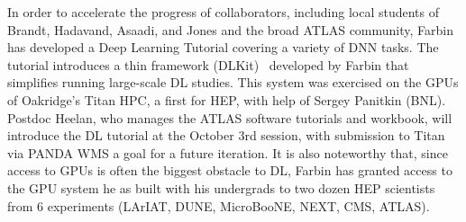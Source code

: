 In order to accelerate the progress of collaborators, including local
students of Brandt, Hadavand, Asaadi, and Jones and the broad ATLAS
community, Farbin has developed a Deep Learning Tutorial covering a
variety of DNN tasks. The tutorial introduces a thin framework
(DLKit)~\cite{DLKit} developed by Farbin that simplifies running
large-scale DL studies. This system was exercised on the GPUs of
Oakridge's Titan HPC, a first for HEP, with help of Sergey Panitkin
(BNL). Postdoc Heelan, who manages the ATLAS software tutorials and
workbook, will introduce the DL tutorial at the October 3rd session,
with submission to Titan via PANDA WMS a goal for a future iteration.
It is also noteworthy that, since access to GPUs is often the biggest
obstacle to DL, Farbin has granted access to the GPU system he as
built with his undergrads to two dozen HEP scientists from 6 experiments
(LArIAT, DUNE, MicroBooNE, NEXT, CMS, ATLAS).





